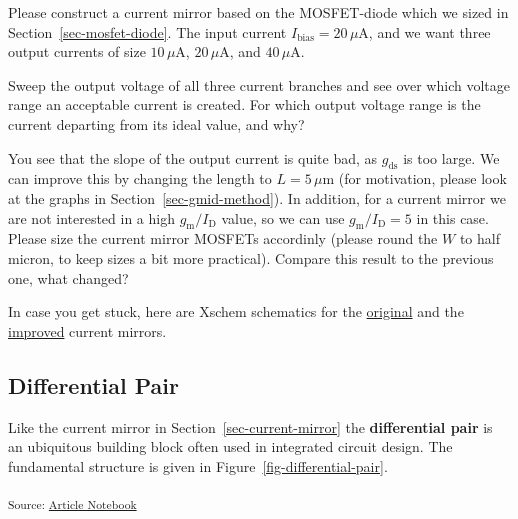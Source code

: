 \documentclass[
  a4paper,
  DIV=11,
  numbers=noendperiod]{scrartcl}
\begin{document}
\begin{tcolorbox}[enhanced jigsaw, opacitybacktitle=0.6, colback=white, left=2mm, toptitle=1mm, opacityback=0, rightrule=.15mm, bottomrule=.15mm, breakable, arc=.35mm, toprule=.15mm, colframe=quarto-callout-tip-color-frame, colbacktitle=quarto-callout-tip-color!10!white, bottomtitle=1mm, titlerule=0mm, coltitle=black, leftrule=.75mm, title=\textcolor{quarto-callout-tip-color}{\faLightbulb}\hspace{0.5em}{Exercise}]

Please construct a current mirror based on the MOSFET-diode which we
sized in Section~\ref{sec-mosfet-diode}. The input current
\(I_\mathrm{bias} = 20\,\mu\text{A}\), and we want three output currents
of size \(10\,\mu\text{A}\), \(20\,\mu\text{A}\), and
\(40\,\mu\text{A}\).

Sweep the output voltage of all three current branches and see over
which voltage range an acceptable current is created. For which output
voltage range is the current departing from its ideal value, and why?

You see that the slope of the output current is quite bad, as
\(g_\mathrm{ds}\) is too large. We can improve this by changing the
length to \(L = 5\,\mu\text{m}\) (for motivation, please look at the
graphs in Section~\ref{sec-gmid-method}). In addition, for a current
mirror we are not interested in a high \(g_\mathrm{m}/I_\mathrm{D}\)
value, so we can use \(g_\mathrm{m}/I_\mathrm{D}= 5\) in this case.
Please size the current mirror MOSFETs accordinly (please round the
\(W\) to half micron, to keep sizes a bit more practical). Compare this
result to the previous one, what changed?

In case you get stuck, here are Xschem schematics for the
\href{./xschem/current_mirror.sch}{original} and the
\href{./xschem/current_mirror_improved.sch}{improved} current mirrors.

\end{tcolorbox}

\subsection{Differential Pair}\label{sec-diff-pair}

Like the current mirror in Section~\ref{sec-current-mirror} the
\textbf{differential pair} is an ubiquitous building block often used in
integrated circuit design. The fundamental structure is given in
Figure~\ref{fig-differential-pair}.

\textsubscript{Source:
\href{https://iic-jku.github.io/analog-circuit-design/index.qmd.html}{Article
Notebook}}
\end{document}
